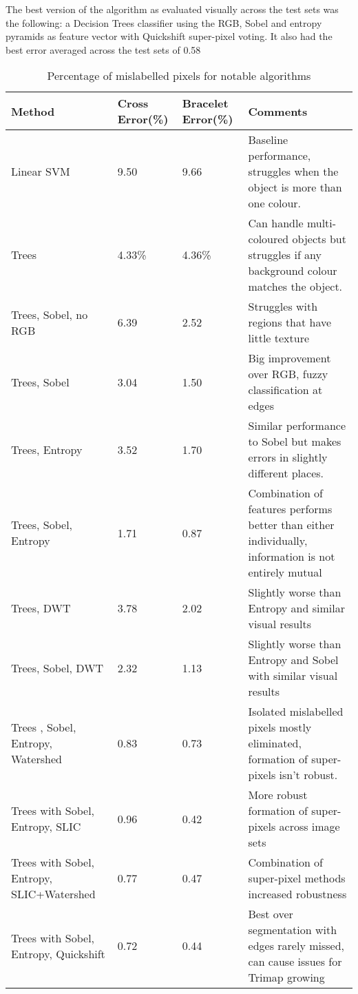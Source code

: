 \documentclass[12pt]{IIBproject}
\begin{document}
The best version of the algorithm as evaluated visually across the test sets was the following: a Decision Trees classifier using the RGB, Sobel and entropy pyramids as feature vector with Quickshift super-pixel voting. It also had the best error averaged across the test sets of 0.58%
\begin{table}[H]
\begin{center}
    \begin{tabular}{ | p{3cm} | l | l | p{5cm} |}
    \hline
    Method & Cross Error(\%) & Bracelet Error(\%) & Comments \\ \hline
    Linear SVM & 9.50 & 9.66 & Baseline performance, struggles when the object is more than one colour.\\ \hline
    Trees & 4.33\% & 4.36\% & Can handle multi-coloured objects but struggles if any background colour matches the object.\\ \hline
    Trees, Sobel, no RGB & 6.39 & 2.52 & Struggles with regions that have little texture \\ \hline
    Trees, Sobel & 3.04 & 1.50 & Big improvement over RGB, fuzzy classification at edges \\ \hline
    Trees, Entropy & 3.52 & 1.70 & Similar performance to Sobel but makes errors in slightly different places.\\ \hline
    Trees, Sobel, Entropy & 1.71 & 0.87 & Combination of features performs better than either individually, information is not entirely mutual\\
    \hline
    Trees, DWT  & 3.78 & 2.02 & Slightly worse than Entropy and similar visual results \\
    \hline
    Trees, Sobel, DWT & 2.32 & 1.13 & Slightly worse than Entropy and Sobel with similar visual results\\
    \hline
    Trees , Sobel, Entropy, Watershed & 0.83 & 0.73 & Isolated mislabelled pixels mostly eliminated, formation of super-pixels isn't robust. \\
    \hline
    Trees with Sobel, Entropy, SLIC & 0.96 & 0.42 & More robust formation of super-pixels across image sets \\
    \hline
    Trees with Sobel, Entropy, SLIC+Watershed & 0.77 & 0.47 & Combination of super-pixel methods increased robustness \\
    \hline
     Trees with Sobel, Entropy, Quickshift & 0.72 & 0.44 & Best over segmentation with edges rarely missed, can cause issues for Trimap growing\\
    \hline
     
    \end{tabular}
    \caption{Percentage of mislabelled pixels for notable algorithms}\label{table:somename}
\end{center}
\end{table}
 
\end{document}
